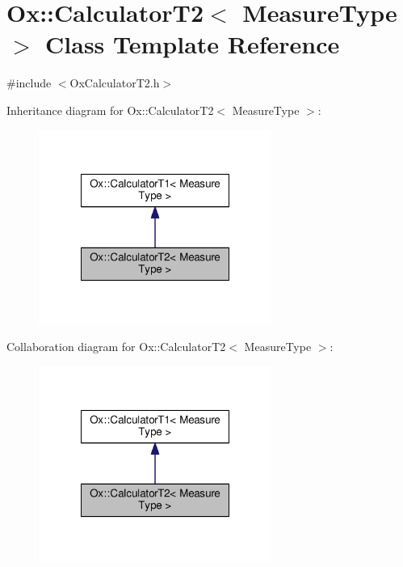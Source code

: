 \hypertarget{class_ox_1_1_calculator_t2}{\section{Ox\-:\-:Calculator\-T2$<$ Measure\-Type $>$ Class Template Reference}
\label{class_ox_1_1_calculator_t2}
}


{\ttfamily \#include $<$Ox\-Calculator\-T2.\-h$>$}



Inheritance diagram for Ox\-:\-:Calculator\-T2$<$ Measure\-Type $>$\-:
\nopagebreak
\begin{figure}[H]
\begin{center}
\leavevmode
\includegraphics[width=216pt]{class_ox_1_1_calculator_t2__inherit__graph}
\end{center}
\end{figure}


Collaboration diagram for Ox\-:\-:Calculator\-T2$<$ Measure\-Type $>$\-:
\nopagebreak
\begin{figure}[H]
\begin{center}
\leavevmode
\includegraphics[width=216pt]{class_ox_1_1_calculator_t2__coll__graph}
\end{center}
\end{figure}
